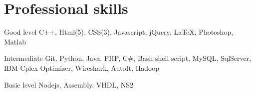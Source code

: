 \documentclass{tccv}
\begin{document}
\begin{eventlist}
\begin{comment}

\item{08/2011 -- 07/2012}
     {Software Developer @ Innovation Project Center of BUPT}
     {SIDES: Scalable Intelligent Distributed Emergency System}
     
     1) Implemented a decentralized self-organize wireless-based emergency system that generates real-time evacuation strategy to save lives in fire hazard. 2) Designed the learning protocol for distributed sensor nodes, And implemented in Zigbee.
\\\\
Shorten evacuation by 50\% comparing to normal strategy, Won first prize as National Class Innovation Project.
\\\\
Publication: \textbf{Junjie, Guan}, Yanyi Wu, Jinming Ma, Tao Li, Chunlei Xie, Yuli Mo SIDES: Scalable Intelligent Distributed Emergency System. Accepted by IEEE Network Infrastructure and Digital Content 2012

\end{comment}
   
\end{eventlist}










































\if
\section{Professional skills}

\begin{factlist}

\item{Good level}
     {C++, Html(5), CSS(3), Javascript, jQuery, \LaTeX, Photoshop, Matlab}

\item{Intermediate}
     {Git, Python, Java, PHP, C\#, Bash shell script, MySQL, SqlServer, IBM Cplex Optimizer, Wireshark, AutoIt, Hadoop}

\item{Basic level}
     {Nodejs, Assembly, VHDL, NS2}

\end{factlist}

\fi
\end{document}
